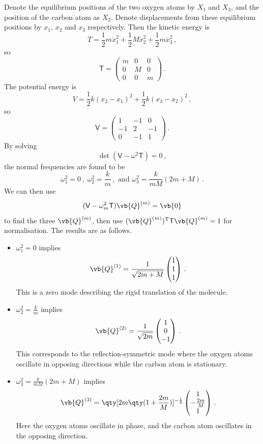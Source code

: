 \documentclass{article}
\theoremstyle{plain}\theoremheaderfont{\normalfont\itshape}\theorembodyfont{\rmfamily}\theoremseparator{.}\newtheorem*{rem}{Remark}\newtheorem*{ex}{Example}\newtheorem*{proof}{Proof}\newtheorem*{altp}{Alternative proof}
\theoremstyle{plain}\theoremheaderfont{\normalfont\bfseries}\theorembodyfont{\rmfamily}\theoremseparator{.}\newtheorem{thm}{Theorem}[section]\newtheorem{lem}[thm]{Lemma}\newtheorem{prop}[thm]{Proposition}\newtheorem*{cor}{Corollary}\newtheorem{defn}[thm]{Definition}\newtheorem{clm}[thm]{Claim}\newtheorem{clminproof}{Claim}
\theoremstyle{break}\theoremheaderfont{\normalfont\itshape}\theorembodyfont{\rmfamily}\theoremseparator{.\medskip}\newtheorem*{proofskip}{Proof}\newtheorem*{exs}{Examples}\newtheorem*{rems}{Remarks}
\theoremstyle{break}\theoremheaderfont{\normalfont\bfseries}\theorembodyfont{\rmfamily}\theoremseparator{.\medskip}\newtheorem{lemskip}[thm]{Lemma}\newtheorem{defnskip}[thm]{Definition}\newtheorem{propskip}[thm]{Proposition}\newtheorem{thmskip}[thm]{Theorem}
\numberwithin{equation}{section}
\newcommand{\tp}{^\mathrm{T}}
\begin{document}
	Denote the equilibrium positions of the two oxygen atoms by \(X_1\) and \(X_3\), and the position of the carbon atom as \(X_2\). Denote displacements from these equilibrium positions by \(x_1\), \(x_2\) and \(x_3\) respectively. Then the kinetic energy is
	\[T=\frac{1}{2}m\dot{x}_1^2+\frac{1}{2}M\dot{x}_2^2+\frac{1}{2}m\dot{x}_3^2\,,\]
	so
	\[\mathsf{T}=\begin{pmatrix}
		m & 0 & 0\\
		0 & M & 0\\
		0 & 0 & m
	\end{pmatrix}\,.\]
	The potential energy is
	\[V=\frac{1}{2}k(x_2-x_1)^2+\frac{1}{2}k(x_3-x_2)^2\,,\]
	so
	\[\mathsf{V}=\begin{pmatrix}
		1 & -1 & 0\\
		-1 & 2 & -1\\
		0 & -1 & 1
	\end{pmatrix}\,.\]
	By solving
	\[\det(\mathsf{V}-\omega^2\mathsf{T})=0\,,\]
	the normal frequencies are found to be
	\[\omega_1^2=0\,,\;\omega_2^2=\frac{k}{m}\,,\text{ and }\omega_3^2=\frac{k}{mM}(2m+M)\,.\]
	We can then use
	\[(\mathsf{V}-\omega_m^2\mathsf{T})\vb{Q}^{(m)}=\vb{0}\]
	to find the three \(\vb{Q}^{(m)}\), then use \((\vb{Q}^{(m)})\tp\mathsf{T}\vb{Q}^{(m)}=1\) for normalisation. The results are as follows.
	\begin{itemize}
		\item \(\omega_1^2=0\) implies
		\[\vb{Q}^{(1)}=\frac{1}{\sqrt{2m+M}}\begin{pmatrix}
			1 \\ 1 \\ 1
		\end{pmatrix}\,.\]
		This is a zero mode describing the rigid translation of the molecule.
		\item \(\omega_2^2=\frac{k}{m}\) implies
		\[\vb{Q}^{(2)}=\frac{1}{\sqrt{2m}}\begin{pmatrix}
			1 \\ 0 \\ -1
		\end{pmatrix}\,.\]
		This corresponds to the reflection-symmetric mode where the oxygen atoms oscillate in opposing directions while the carbon atom is stationary.
		\item \(\omega_3^2=\frac{k}{mM}(2m+M)\) implies
		\[\vb{Q}^{(3)}=\qty[2m\qty(1+\frac{2m}{M})]^{-\frac{1}{2}}\begin{pmatrix}
			1 \\ -\frac{2m}{M} \\ 1
		\end{pmatrix}\,.\]
		Here the oxygen atoms oscillate in phase, and the carbon atom oscillates in the opposing direction.
	\end{itemize}
\end{document}
